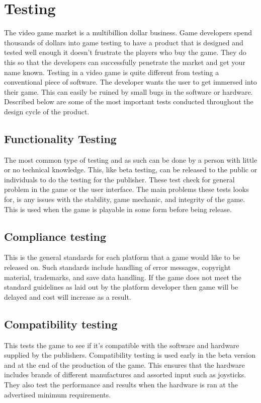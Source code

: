 \section{Testing}

The video game market is a multibillion dollar business. Game developers spend thousands of dollars into game testing to have a product that is designed and tested well enough it doesn't frustrate the players who buy the game.  They do this so that the developers can successfully penetrate the market and get your name known.  Testing in a video game is quite different from testing a conventional piece of software.  The developer wants the user to get immersed into their game. This can easily be ruined by small bugs in the software or hardware.  Described below are some of the most important tests conducted throughout the design cycle of the product.

\subsection{Functionality Testing} The most common type of testing and as such can be done by a person with little or no technical knowledge. This, like beta testing, can be released to the public or individuals to do the testing for the publisher. These test check for general problem in the game or the user interface. The main problems these tests looks for, is any issues with the stability, game mechanic, and integrity of the game. This is used when the game is playable in some form before being release.

\subsection{Compliance testing}  This is the general standards for each platform that a game would like to be released on.  Such standards include handling of error messages, copyright material, trademarks, and save data handling. If the game does not meet the standard guidelines as laid out by the platform developer then game will be delayed and cost will increase as a result.

\subsection{Compatibility testing}  This tests the game to see if it’s compatible with the software and hardware supplied by the publishers.  Compatibility testing is used early in the beta version and at the end of the production of the game.  This ensures that the hardware includes brands of different manufactures and assorted input such as joysticks. They also test the performance and results when the hardware is ran at the advertised minimum requirements.

